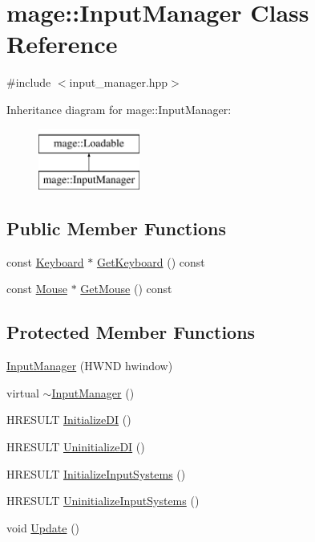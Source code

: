 \hypertarget{classmage_1_1_input_manager}{}\section{mage\+:\+:Input\+Manager Class Reference}
\label{classmage_1_1_input_manager}


{\ttfamily \#include $<$input\+\_\+manager.\+hpp$>$}

Inheritance diagram for mage\+:\+:Input\+Manager\+:\begin{figure}[H]
\begin{center}
\leavevmode
\includegraphics[height=2.000000cm]{classmage_1_1_input_manager}
\end{center}
\end{figure}
\subsection*{Public Member Functions}
\begin{DoxyCompactItemize}
\item 
const \hyperlink{classmage_1_1_keyboard}{Keyboard} $\ast$ \hyperlink{classmage_1_1_input_manager_a5b72139e30d1f3da6cda50f2989c1350}{Get\+Keyboard} () const
\item 
const \hyperlink{classmage_1_1_mouse}{Mouse} $\ast$ \hyperlink{classmage_1_1_input_manager_ad268916e07f44e40bf267efa0e673186}{Get\+Mouse} () const
\end{DoxyCompactItemize}
\subsection*{Protected Member Functions}
\begin{DoxyCompactItemize}
\item 
\hyperlink{classmage_1_1_input_manager_afc28df27a0251c242113a9761c007534}{Input\+Manager} (H\+W\+ND hwindow)
\item 
virtual \hyperlink{classmage_1_1_input_manager_a287ca0e91ec079227c102f7eadd5bb46}{$\sim$\+Input\+Manager} ()
\item 
H\+R\+E\+S\+U\+LT \hyperlink{classmage_1_1_input_manager_af3ca0717e37916463cc4f40c7d174b33}{Initialize\+DI} ()
\item 
H\+R\+E\+S\+U\+LT \hyperlink{classmage_1_1_input_manager_af16e113638fed35d34256f99bf061ef4}{Uninitialize\+DI} ()
\item 
H\+R\+E\+S\+U\+LT \hyperlink{classmage_1_1_input_manager_a34f114c4c667a4a14ce8236b35d308d8}{Initialize\+Input\+Systems} ()
\item 
H\+R\+E\+S\+U\+LT \hyperlink{classmage_1_1_input_manager_abecb06833973cab1ccabc7b28580209d}{Uninitialize\+Input\+Systems} ()
\item 
void \hyperlink{classmage_1_1_input_manager_a5e516969ff4ae9876b98c28f48f93726}{Update} ()
\end{DoxyCompactItemize}
